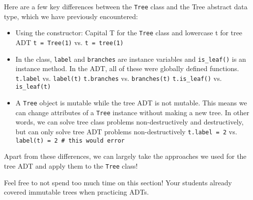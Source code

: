\vspace{2mm}
Here are a few key differences between the \lstinline{Tree} class and the Tree abstract data type, which we have previously encountered: 
\begin{itemize}
\item Using the constructor: Capital T for the \lstinline{Tree} class and lowercase t for tree ADT
    \lstinline{t = Tree(1)} vs. \lstinline{t = tree(1)}
\item In the class, \lstinline{label} and \lstinline{branches} are instance variables and \lstinline{is_leaf()} is an instance method. In the ADT, all of these were globally defined functions.
    \subitem \lstinline{t.label} vs. \lstinline{label(t)}
    \subitem \lstinline{t.branches} vs. \lstinline{branches(t)}
    \subitem \lstinline{t.is_leaf()} vs. \lstinline{is_leaf(t)}
\item A \lstinline{Tree} object is mutable while the tree ADT is not mutable. This means we can change attributes of a \lstinline{Tree} instance without making a new tree. In other words, we can solve tree class problems non-destructively and destructively, but can only solve tree ADT problems non-destructively
    \subitem \lstinline{t.label = 2} vs. \lstinline{label(t) = 2 # this would error}
\end{itemize}
Apart from these differences, we can largely take the approaches we used for the tree ADT and apply them to the \lstinline{Tree} class!

\begin{meta}
Feel free to not spend too much time on this section! Your students already covered immutable trees when practicing ADTs.  
\end{meta}